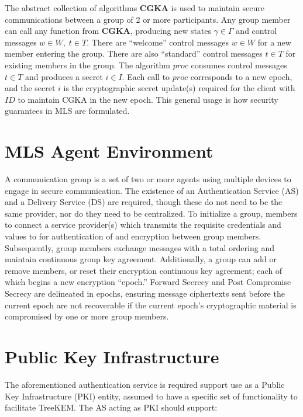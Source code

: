 \documentclass[12pt,twocolumn]{article}
\begin{document}
	The abstract collection of algorithms \textbf{CGKA} is used to maintain secure communications between a group of 2 or more participants.
	Any group member can call any function from \textbf{CGKA}, producing new states $\gamma \in \Gamma$ and control messages $w \in W,\; t \in T$.
	There are ``welcome'' control messages $w \in W$ for a new member entering the group.
	There are also ``standard'' control messages $t \in T$ for existing members in the group.
	The algorithm $proc$ consumes control messages $t \in T$ and produces a secret $i \in I$. 
	Each call to $proc$ corresponds to a new epoch, and the secret $i$ is the cryptographic secret update(s) required for the client with $ID$ to maintain CGKA in the new epoch.
	This general usage is how security guarantees in MLS are formulated.

	
	\section*{MLS Agent Environment}
	
	A communication group is a set of two or more agents using multiple devices to engage in secure communication.
	The existence of an Authentication Service (AS) and a Delivery Service (DS) are required, though these do not need to be the same provider, nor do they need to be centralized.
	To initialize a group, members to connect a service provider(s) which transmits the requisite credentials and values to for authentication of and encryption between group members.
	Subsequently, group members exchange messages with a total ordering and maintain continuous group key agreement.
	Additionally, a group can add or remove members, or reset their encryption continuous key agreement; each of which begins a new encryption ``epoch.''
	Forward Secrecy and Post Compromise Secrecy are delineated in epochs, ensuring message ciphertexts sent before the current epoch are not recoverable if the current epoch's cryptographic material is compromised by one or more group members.
	
	\section*{Public Key Infrastructure}
	
	The aforementioned authentication service is required support use as a Public Key Infrastructure (PKI) entity, assumed to have a specific set of functionality to facilitate TreeKEM.
	The AS acting as PKI should support:
	
\end{document}
